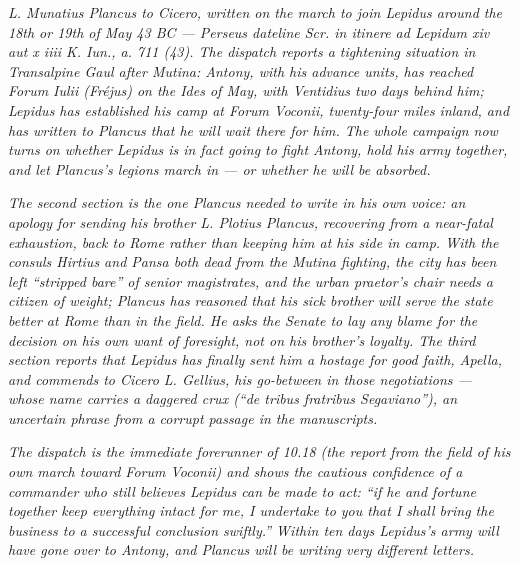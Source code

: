 
\textit{L. Munatius Plancus to Cicero, written on the march to
join Lepidus around the 18th or 19th of May 43 BC --- Perseus
dateline \textit{Scr. in itinere ad Lepidum xiv aut x iiii K.
Iun., a. 711 (43)}. The dispatch reports a tightening
situation in Transalpine Gaul after Mutina: Antony, with his
advance units, has reached Forum Iulii (Fr\'ejus) on the Ides
of May, with Ventidius two days behind him; Lepidus has
established his camp at Forum Voconii, twenty-four miles
inland, and has written to Plancus that he will wait there
for him. The whole campaign now turns on whether Lepidus is
in fact going to fight Antony, hold his army together, and
let Plancus's legions march in --- or whether he will be
absorbed.}

\textit{The second section is the one Plancus needed to write
in his own voice: an apology for sending his brother L.
Plotius Plancus, recovering from a near-fatal exhaustion,
back to Rome rather than keeping him at his side in camp.
With the consuls Hirtius and Pansa both dead from the
Mutina fighting, the city has been left ``stripped bare''
of senior magistrates, and the urban praetor's chair needs
a citizen of weight; Plancus has reasoned that his sick
brother will serve the state better at Rome than in the
field. He asks the Senate to lay any blame for the decision
on his own want of foresight, not on his brother's loyalty.
The third section reports that Lepidus has finally sent
him a hostage for good faith, Apella, and commends to
Cicero L. Gellius, his go-between in those negotiations
--- whose name carries a daggered crux (``de tribus
fratribus Segaviano''), an uncertain phrase from a corrupt
passage in the manuscripts.}

\textit{The dispatch is the immediate forerunner of 10.18 (the
report from the field of his own march toward Forum Voconii)
and shows the cautious confidence of a commander who still
believes Lepidus can be made to act: ``if he and fortune
together keep everything intact for me, I undertake to you
that I shall bring the business to a successful conclusion
swiftly.'' Within ten days Lepidus's army will have gone over
to Antony, and Plancus will be writing very different
letters.}

